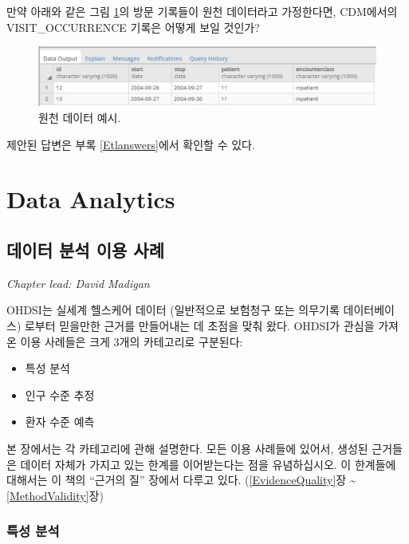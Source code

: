 \documentclass[11pt]{book}
\providecommand{\tightlist}{%
  \setlength{\itemsep}{0pt}\setlength{\parskip}{0pt}}
\theoremstyle{definition}
\theoremstyle{definition}
\theoremstyle{definition}
\theoremstyle{remark}
\begin{document}
만약 아래와 같은 그림 \ref{fig:exerciseSourceData}의 방문 기록들이 원천
데이터라고 가정한다면, CDM에서의 VISIT\_OCCURRENCE 기록은 어떻게 보일
것인가?

\begin{figure}

{\centering \includegraphics[width=1\linewidth]{images/ExtractTransformLoad/exerciseSourceData} 

}

\caption{원천 데이터 예시.}\label{fig:exerciseSourceData}
\end{figure}

제안된 답변은 부록 \ref{Etlanswers}에서 확인할 수 있다.

\part{Data Analytics}\label{part-data-analytics}

\chapter{데이터 분석 이용 사례}\label{DataAnalyticsUseCases}

\emph{Chapter lead: David Madigan}

OHDSI는 실세계 헬스케어 데이터 (일반적으로 보험청구 또는 의무기록
데이터베이스) 로부터 믿을만한 근거를 만들어내는 데 초점을 맞춰 왔다.
OHDSI가 관심을 가져온 이용 사례들은 크게 3개의 카테고리로 구분된다:

\begin{itemize}
\tightlist
\item
  특성 분석
\item
  인구 수준 추정
\item
  환자 수준 예측
\end{itemize}

본 장에서는 각 카테고리에 관해 설명한다. 모든 이용 사례들에 있어서,
생성된 근거들은 데이터 자체가 가지고 있는 한계를 이어받는다는 점을
유념하십시오. 이 한계들에 대해서는 이 책의 ``근거의 질'' 장에서 다루고
있다. (\ref{EvidenceQuality}장 \textasciitilde{} \ref{MethodValidity}장)

\section{특성 분석}\label{-}
\end{document}
